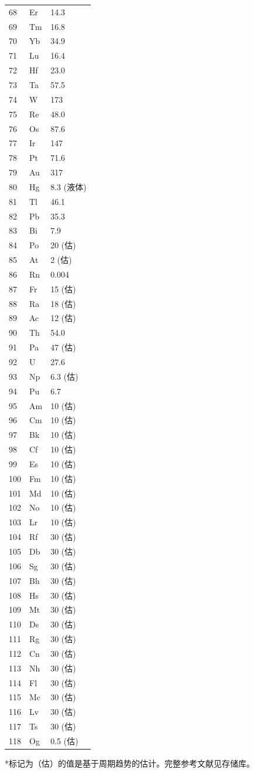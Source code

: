 \documentclass[12pt,a4paper]{article}
\begin{document}
\begin{longtable}{p{0.6cm}p{1.2cm}p{1.5cm}}
		68 & Er & 14.3 \\
		69 & Tm & 16.8 \\
		70 & Yb & 34.9 \\
		71 & Lu & 16.4 \\
		72 & Hf & 23.0 \\
		73 & Ta & 57.5 \\
		74 & W  & 173 \\
		75 & Re & 48.0 \\
		76 & Os & 87.6 \\
		77 & Ir & 147 \\
		78 & Pt & 71.6 \\
		79 & Au & 317 \\
		80 & Hg & 8.3 (液体) \\
		81 & Tl & 46.1 \\
		82 & Pb & 35.3 \\
		83 & Bi & 7.9 \\
		84 & Po & 20 (估) \\
		85 & At & 2 (估) \\
		86 & Rn & 0.004 \\
		87 & Fr & 15 (估) \\
		88 & Ra & 18 (估) \\
		89 & Ac & 12 (估) \\
		90 & Th & 54.0 \\
		91 & Pa & 47 (估) \\
		92 & U  & 27.6 \\
		93 & Np & 6.3 (估) \\
		94 & Pu & 6.7 \\
		95 & Am & 10 (估) \\
		96 & Cm & 10 (估) \\
		97 & Bk & 10 (估) \\
		98 & Cf & 10 (估) \\
		99 & Es & 10 (估) \\
		100& Fm & 10 (估) \\
		101& Md & 10 (估) \\
		102& No & 10 (估) \\
		103& Lr & 10 (估) \\
		104& Rf & 30 (估) \\
		105& Db & 30 (估) \\
		106& Sg & 30 (估) \\
		107& Bh & 30 (估) \\
		108& Hs & 30 (估) \\
		109& Mt & 30 (估) \\
		110& Ds & 30 (估) \\
		111& Rg & 30 (估) \\
		112& Cn & 30 (估) \\
		113& Nh & 30 (估) \\
		114& Fl & 30 (估) \\
		115& Mc & 30 (估) \\
		116& Lv & 30 (估) \\
		117& Ts & 30 (估) \\
		118& Og & 0.5 (估) \\
		\bottomrule
	\end{longtable}
	*标记为（估）的值是基于周期趋势的估计。完整参考文献见存储库。
	
\end{document}
